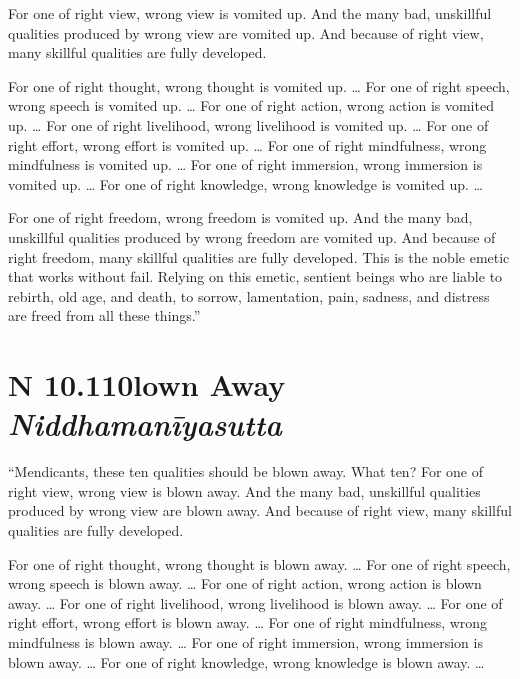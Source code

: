\documentclass[12pt,openany]{book}%
\newcommand*{\suttatitleacronym}[1]{\smaller[2]{#1}\vspace*{.3em}}
\newcommand*{\suttatitletranslation}[1]{\linebreak{#1}}
\newcommand*{\suttatitleroot}[1]{\linebreak\smaller[2]\itshape{#1}}
\newcommand*{\tocacronym}[1]{\hspace*{-3.3em}{#1}\quad}
\newcommand*{\toctranslation}[1]{#1}
\newcommand*{\tocroot}[1]{(\textit{#1})}
\begin{document}
For one of right view, wrong view is vomited up. And the many bad, unskillful qualities produced by wrong view are vomited up. And because of right view, many skillful qualities are fully developed. 

For one of right thought, wrong thought is vomited up. … For one of right speech, wrong speech is vomited up. … For one of right action, wrong action is vomited up. … For one of right livelihood, wrong livelihood is vomited up. … For one of right effort, wrong effort is vomited up. … For one of right mindfulness, wrong mindfulness is vomited up. … For one of right immersion, wrong immersion is vomited up. … For one of right knowledge, wrong knowledge is vomited up. … 

For one of right freedom, wrong freedom is vomited up. And the many bad, unskillful qualities produced by wrong freedom are vomited up. And because of right freedom, many skillful qualities are fully developed. This is the noble emetic that works without fail. Relying on this emetic, sentient beings who are liable to rebirth, old age, and death, to sorrow, lamentation, pain, sadness, and distress are freed from all these things.” 

%
\section*{{\suttatitleacronym AN 10.110}{\suttatitletranslation Blown Away }{\suttatitleroot Niddhamanīyasutta}}
\addcontentsline{toc}{section}{\tocacronym{AN 10.110} \toctranslation{Blown Away } \tocroot{Niddhamanīyasutta}}

“Mendicants, these ten qualities should be blown away. What ten? For one of right view, wrong view is blown away. And the many bad, unskillful qualities produced by wrong view are blown away. And because of right view, many skillful qualities are fully developed. 

For one of right thought, wrong thought is blown away. … For one of right speech, wrong speech is blown away. … For one of right action, wrong action is blown away. … For one of right livelihood, wrong livelihood is blown away. … For one of right effort, wrong effort is blown away. … For one of right mindfulness, wrong mindfulness is blown away. … For one of right immersion, wrong immersion is blown away. … For one of right knowledge, wrong knowledge is blown away. … 
\end{document}
